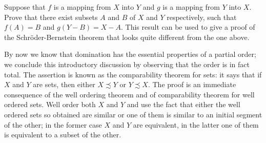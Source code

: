 \begin{named}[EXERCISE. ] Suppose that $f$ is a mapping from $X$ into $Y$ and $g$ is a mapping from $Y$ into $X$. Prove that there exist subsets $A$ and $B$ of $X$ and $Y$ respectively, such that $f(A) = B$ and $g(Y - B) = X - A$. This result can be used to give a proof of the Schröder-Bernstein theorem that looks quite different from the one above. 
\end{named}

By now we know that domination has the essential properties of a partial order; we conclude this introductory discussion by observing that the order is in fact total. The assertion is known as the comparability theorem for sets: it says that if $X$ and $Y$ are sets, then either $X \precsim Y$ or $Y \precsim X$. The proof is an immediate consequence of the well ordering theorem and of comparability theorem for well ordered sets. Well order both $X$ and $Y$ and use the fact that either the well ordered sets so obtained are similar or one of them is similar to an initial segment of the other; in the former case $X$ and $Y$ are equivalent, in the latter one of them is equivalent to a subset of the other.